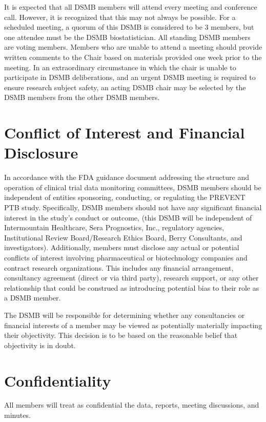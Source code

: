 \documentclass[12pt]{article}
\begin{document}
It is expected that all DSMB members will attend every meeting and 
conference call. However, it is recognized that this may not always be 
possible. For a scheduled meeting, a quorum of this DSMB is considered to be 
3 members, but one attendee must be the DSMB biostatistician. All standing 
DSMB members are voting members. Members who are unable to attend a meeting 
should provide written comments to the Chair based on materials provided one 
week prior to the meeting.  In an extraordinary circumstance in which the 
chair is unable to participate in DSMB deliberations, and an urgent DSMB 
meeting is required to ensure research subject safety, an acting DSMB chair 
may be selected by the DSMB members from the other DSMB members.


\section{Conflict of Interest and Financial Disclosure}
In accordance with the FDA guidance document addressing the structure and 
operation of clinical trial data monitoring committees, DSMB members should 
be independent of entities sponsoring, conducting, or regulating the PREVENT 
PTB study. Specifically, DSMB members should not have any significant 
financial interest in the study's conduct or outcome, (this DSMB will be 
independent of Intermountain Healthcare, Sera Prognostics, Inc., regulatory 
agencies, Institutional Review Board/Research Ethics Board, Berry 
Consultants, and investigators). Additionally, members must disclose any 
actual or potential conflicts of interest involving pharmaceutical or 
biotechnology companies and contract research organizations. This includes 
any financial arrangement, consultancy agreement (direct or via third 
party), research support, or any other relationship that could be construed 
as introducing potential bias to their role as a DSMB member. 

The DSMB will be responsible for determining whether any consultancies or 
financial interests of a member may be viewed as potentially materially 
impacting their objectivity. This decision is to be based on the reasonable 
belief that objectivity is in doubt. 

\section{Confidentiality}
All members will treat as confidential the data, reports, meeting 
discussions, and minutes.
\end{document}
